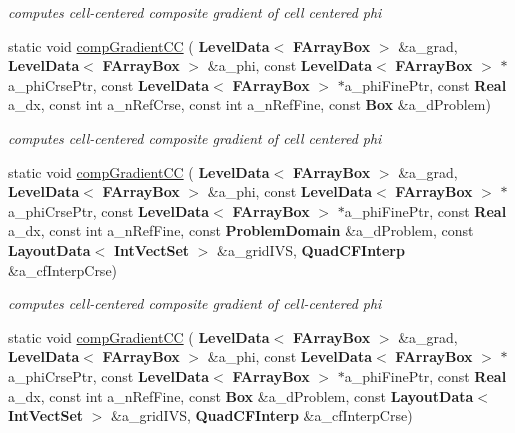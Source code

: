 \begin{DoxyCompactItemize}
\begin{DoxyCompactList}\small\item\em computes cell-\/centered composite gradient of cell centered phi \end{DoxyCompactList}\item 
static void \hyperlink{class_gradient_a0a941dcb9ad58ed819f41d4fe1080106}{comp\+Gradient\+CC} (\textbf{ Level\+Data}$<$ \textbf{ F\+Array\+Box} $>$ \&a\+\_\+grad, \textbf{ Level\+Data}$<$ \textbf{ F\+Array\+Box} $>$ \&a\+\_\+phi, const \textbf{ Level\+Data}$<$ \textbf{ F\+Array\+Box} $>$ $\ast$a\+\_\+phi\+Crse\+Ptr, const \textbf{ Level\+Data}$<$ \textbf{ F\+Array\+Box} $>$ $\ast$a\+\_\+phi\+Fine\+Ptr, const \textbf{ Real} a\+\_\+dx, const int a\+\_\+n\+Ref\+Crse, const int a\+\_\+n\+Ref\+Fine, const \textbf{ Box} \&a\+\_\+d\+Problem)
\begin{DoxyCompactList}\small\item\em computes cell-\/centered composite gradient of cell centered phi \end{DoxyCompactList}\item 
static void \hyperlink{class_gradient_a029f7d1cb39888c2e12b9fb016b58928}{comp\+Gradient\+CC} (\textbf{ Level\+Data}$<$ \textbf{ F\+Array\+Box} $>$ \&a\+\_\+grad, \textbf{ Level\+Data}$<$ \textbf{ F\+Array\+Box} $>$ \&a\+\_\+phi, const \textbf{ Level\+Data}$<$ \textbf{ F\+Array\+Box} $>$ $\ast$a\+\_\+phi\+Crse\+Ptr, const \textbf{ Level\+Data}$<$ \textbf{ F\+Array\+Box} $>$ $\ast$a\+\_\+phi\+Fine\+Ptr, const \textbf{ Real} a\+\_\+dx, const int a\+\_\+n\+Ref\+Fine, const \textbf{ Problem\+Domain} \&a\+\_\+d\+Problem, const \textbf{ Layout\+Data}$<$ \textbf{ Int\+Vect\+Set} $>$ \&a\+\_\+grid\+I\+VS, \textbf{ Quad\+C\+F\+Interp} \&a\+\_\+cf\+Interp\+Crse)
\begin{DoxyCompactList}\small\item\em computes cell-\/centered composite gradient of cell-\/centered phi \end{DoxyCompactList}\item 
static void \hyperlink{class_gradient_a4f44d7eef3d2b675d9c67c90b9904747}{comp\+Gradient\+CC} (\textbf{ Level\+Data}$<$ \textbf{ F\+Array\+Box} $>$ \&a\+\_\+grad, \textbf{ Level\+Data}$<$ \textbf{ F\+Array\+Box} $>$ \&a\+\_\+phi, const \textbf{ Level\+Data}$<$ \textbf{ F\+Array\+Box} $>$ $\ast$a\+\_\+phi\+Crse\+Ptr, const \textbf{ Level\+Data}$<$ \textbf{ F\+Array\+Box} $>$ $\ast$a\+\_\+phi\+Fine\+Ptr, const \textbf{ Real} a\+\_\+dx, const int a\+\_\+n\+Ref\+Fine, const \textbf{ Box} \&a\+\_\+d\+Problem, const \textbf{ Layout\+Data}$<$ \textbf{ Int\+Vect\+Set} $>$ \&a\+\_\+grid\+I\+VS, \textbf{ Quad\+C\+F\+Interp} \&a\+\_\+cf\+Interp\+Crse)

\end{DoxyCompactItemize}
